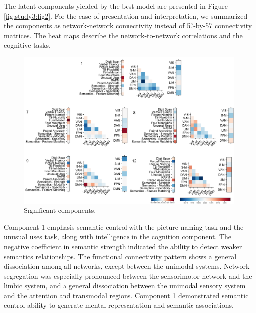 The latent components yielded by the best model are presented in Figure \ref{fig:study3:fig2}. For the ease of presentation and interpretation, we summarized the components as network-network connectivity instead of 57-by-57 connectivity matrices. The heat maps describe the network-to-network correlations and the cognitive tasks.

\begin{figure}[H]
	\centering
	\includegraphics[width=1\textwidth]{study3/image/study3fig3.png}
	\caption{Significant components.}
	\label{fig:study3:fig3}
\end{figure}

Component 1 emphasis semantic control with the picture-naming task and the unusual uses task, along with intelligence in the cognition component. The negative coefficient in semantic strength indicated the ability to detect weaker semantics relationships. The functional connectivity pattern shows a general dissociation among all networks, except between the unimodal systems. Network segregation was especially pronounced between the sensorimotor network and the limbic system, and a general dissociation between the unimodal sensory system and the attention and transmodal regions. Component 1 demonstrated semantic control ability to generate mental representation and semantic associations. 

